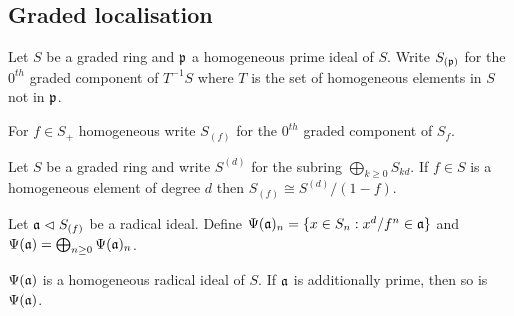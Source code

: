 \documentclass{memoir}
\begin{document}
\subsection{Graded localisation}
\begin{definition}
    Let $S$ be a graded ring and $\mathfrak{p}$ a homogeneous prime ideal of $S$.
    Write $S_{(\mathfrak{p})}$ for the $0^{th}$ graded component of $T^{-1}S$ where $T$ is the set of homogeneous elements in $S$ not in $\mathfrak{p}$.

    For $f\in S_+$ homogeneous write $S_{(f)}$ for the $0^{th}$ graded component of $S_f$.
\end{definition}
\begin{proposition}
    Let $S$ be a graded ring and write $S^{(d)}$ for the subring $\bigoplus_{k\ge0}S_{kd}$.
    If $f\in S$ is a homogeneous element of degree $d$ then $S_{(f)} \cong S^{(d)}/(1-f)$.
\end{proposition}
%
\begin{definition}
    Let $\mathfrak{a}\vartriangleleft S_{(f)}$ be a radical ideal.
    Define $\Psi(\mathfrak{a})_n = \lbrace x\in S_n:x^d/f^n \in \mathfrak{a}\rbrace$ and $\Psi(\mathfrak{a}) = \bigoplus_{n\ge0}\Psi(\mathfrak{a})_n$.
\end{definition}
\begin{lemma}
    $\Psi(\mathfrak{a})$ is a homogeneous radical ideal of $S$.
    If $\mathfrak{a}$ is additionally prime, then so is $\Psi(\mathfrak{a})$.
\end{lemma}
\end{document}
